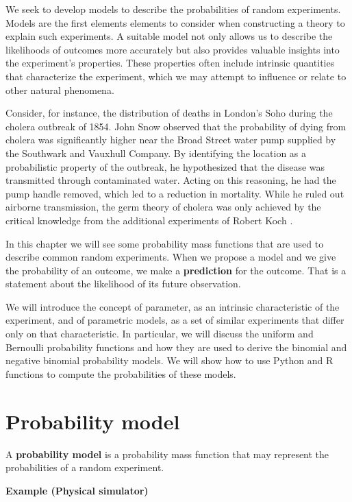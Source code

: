 \documentclass[
]{book}
\begin{document}
We seek to develop models to describe the probabilities of random experiments. Models are the first elements elements to consider when constructing a theory to explain such experiments. A suitable model not only allows us to describe the likelihoods of outcomes more accurately but also provides valuable insights into the experiment's properties. These properties often include intrinsic quantities that characterize the experiment, which we may attempt to influence or relate to other natural phenomena.

Consider, for instance, the distribution of deaths in London's Soho during the cholera outbreak of 1854. John Snow observed that the probability of dying from cholera was significantly higher near the Broad Street water pump supplied by the Southwark and Vauxhull Company. By identifying the location as a probabilistic property of the outbreak, he hypothesized that the disease was transmitted through contaminated water. Acting on this reasoning, he had the pump handle removed, which led to a reduction in mortality. While he ruled out airborne transmission, the germ theory of cholera was only achieved by the critical knowledge from the additional experiments of Robert Koch \citep{Lippi2014}.

In this chapter we will see some probability mass functions that are used to describe common random experiments. When we propose a model and we give the probability of an outcome, we make a \textbf{prediction} for the outcome. That is a statement about the likelihood of its future observation.

We will introduce the concept of parameter, as an intrinsic characteristic of the experiment, and of parametric models, as a set of similar experiments that differ only on that characteristic. In particular, we will discuss the uniform and Bernoulli probability functions and how they are used to derive the binomial and negative binomial probability models. We will show how to use Python and R functions to compute the probabilities of these models.

\hypertarget{probability-model}{%
\section{Probability model}\label{probability-model}}

A \textbf{probability model} is a probability mass function that may represent the probabilities of a random experiment.

\textbf{Example (Physical simulator)}
\end{document}
